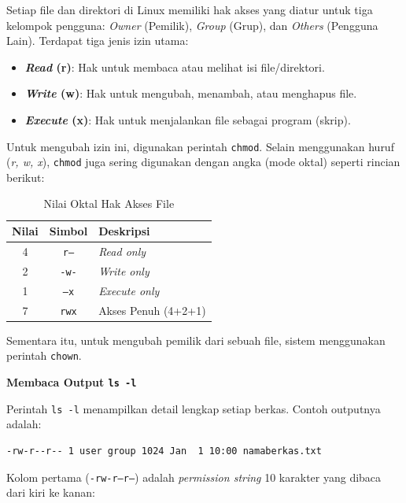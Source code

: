 Setiap file dan direktori di Linux memiliki hak akses yang diatur untuk tiga kelompok pengguna: \textit{Owner} (Pemilik), \textit{Group} (Grup), dan \textit{Others} (Pengguna Lain). Terdapat tiga jenis izin utama:
\begin{itemize}
	\item \textbf{\textit{Read} (r)}: Hak untuk membaca atau melihat isi file/direktori.
	\item \textbf{\textit{Write} (w)}: Hak untuk mengubah, menambah, atau menghapus file.
	\item \textbf{\textit{Execute} (x)}: Hak untuk menjalankan file sebagai program (skrip).
\end{itemize}

Untuk mengubah izin ini, digunakan perintah \texttt{chmod}. Selain menggunakan huruf (\textit{r, w, x}), \texttt{chmod} juga sering digunakan dengan angka (mode oktal) seperti rincian berikut:

\begin{table}[H]
	\caption{Nilai Oktal Hak Akses File}
	\label{tab:chmod-oktal}
	\centering
	\begin{tabular}{|c|c|l|}
		\hline
		\textbf{Nilai} & \textbf{Simbol} & \textbf{Deskripsi}    \\ \hline
		4              & \texttt{r--}    & \textit{Read only}    \\ \hline
		2              & \texttt{-w-}    & \textit{Write only}   \\ \hline
		1              & \texttt{--x}    & \textit{Execute only} \\ \hline
		7              & \texttt{rwx}    & Akses Penuh (4+2+1)   \\ \hline
	\end{tabular}
\end{table}

Sementara itu, untuk mengubah pemilik dari sebuah file, sistem menggunakan perintah \texttt{chown}.

\vspace{0.5em}
\noindent\textbf{Membaca Output \texttt{ls -l}}

Perintah \texttt{ls -l} menampilkan detail lengkap setiap berkas. Contoh outputnya adalah:

\begin{lstlisting}[language=bash]
-rw-r--r-- 1 user group 1024 Jan  1 10:00 namaberkas.txt
\end{lstlisting}

Kolom pertama (\texttt{-rw-r--r--}) adalah \textit{permission string} 10 karakter yang dibaca dari kiri ke kanan:

